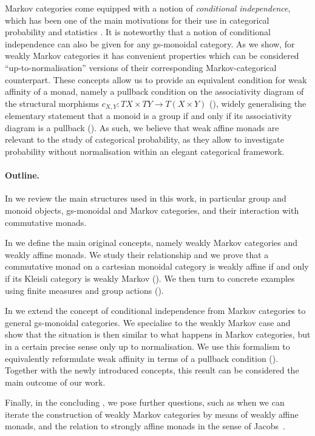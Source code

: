 \documentclass[a4paper,UKenglish,numberwithinsect,cleveref, autoref, thm-restate]{lipics-v2021}
\theoremstyle{plain} %
\theoremstyle{definition} %
\begin{document}
Markov categories come equipped with a notion of \emph{conditional independence}, which has been one of the main motivations for their use in categorical probability and statistics \cite{cho_jacobs_2019,Fritz_2020,fritz2022dseparation}.
It is noteworthy that a notion of conditional independence can also be given for any gs-monoidal category. As we show, for weakly Markov categories it has convenient properties which can be considered ``up-to-normalisation'' versions of their corresponding Markov-categorical counterpart.
%
These concepts allow us to provide an equivalent condition for weak affinity of a monad, namely a pullback condition on the associativity diagram of the structural morphisms $c_{X,Y}:TX\times TY\to T(X\times Y)$ (), widely generalising the elementary statement that a monoid is a group if and only if its associativity diagram is a pullback (). 
%
As such, we believe that weak affine monads are relevant to the study of categorical probability, 
as they allow to investigate probability without normalisation within an elegant categorical framework.

\paragraph*{Outline.}
In  we review the main structures used in this work, in particular group and monoid objects, gs-monoidal and Markov categories, and their interaction with commutative monads.

In  we define the main original concepts, namely weakly Markov categories and weakly affine monads. We study their relationship and we prove that a commutative monad on a cartesian monoidal category is weakly affine if and only if its Kleisli category is weakly Markov ().
We then turn to concrete examples using finite measures and group actions ().

In  we extend the concept of conditional independence from Markov categories to general gs-monoidal categories. We specialise to the weakly Markov case and show that the situation is then similar to what happens in Markov categories, but in a certain precise sense only up to normalisation.
We use this formalism to equivalently reformulate weak affinity in terms of a pullback condition (). Together with the newly introduced concepts, 
this result can be considered the main outcome of our work.

Finally, in the concluding , we pose further questions, such as when we can iterate the construction of weakly Markov categories by means of weakly affine monads, and the relation to strongly affine monads in the sense of Jacobs~\cite{Jacobs16}. 
\end{document}
